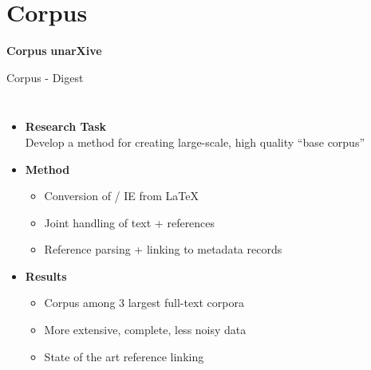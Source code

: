 \documentclass[en,16:9,smallfoot]{sdqbeamer}
\begin{document}
\section{Corpus}

   \begin{frame}[plain]
        \vspace{0.7cm}
        \begin{infobox-map}
        \centering
        \begin{Huge}
         {\textbf{Corpus}}
         {\textbf{\hphantom{C}unarXive\hphantom{C}}}
        \end{Huge}
        \end{infobox-map}
   \end{frame}

   \begin{frame}{Corpus - Digest}
   \begin{columns}
        \begin{itemize}
            \item \textbf{Research Task}\\Develop a method for creating large-scale, high quality ``base corpus''
            \item \textbf{Method}
            \begin{itemize}
                \item Conversion of / IE from \LaTeX
                \item Joint handling of text + references
                \item Reference parsing + linking to metadata records
            \end{itemize}
            \item \textbf{Results}
            \begin{itemize}
                \item Corpus among 3 largest full-text corpora
                \item More extensive, complete, less noisy data
                \item State of the art reference linking
            \end{itemize}
        \end{itemize}

\end{columns}
\end{frame}
\end{document}
